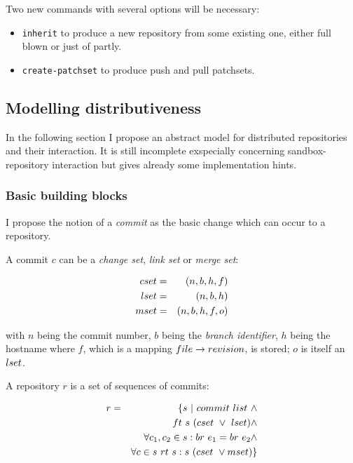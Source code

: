 \documentclass[fleqn, german, 10pt, a4paper]{article}
\begin{document}
Two new commands with several options will be necessary:
\begin{itemize}
\item \texttt{inherit} to produce a new repository from some existing one,
either full blown or just of partly.
\item \texttt{create-patchset} to produce push and pull patchsets.
\end{itemize}

\subsection{Modelling distributiveness}

In the following section I propose an abstract model for distributed
repositories and their interaction. It is still incomplete
exspecially concerning sandbox-repository interaction but gives already
some implementation hints.

\subsubsection{Basic building blocks}

I propose the notion of a \emph{commit} as the basic change which can
occur to a repository.

A commit $c$ can be a \emph{change set}, \emph{link set} or
\emph{merge set}:

\begin{eqnarray*}
\mathnormal{cset} &=& (n, b, h, f) \\
\mathnormal{lset} &=& (n, b, h) \\
\mathnormal{mset} &=& (n, b, h, f, o)
\end{eqnarray*}

with $n$ being the commit number, $b$ being the \emph{branch identifier},
$h$ being the hostname where $f$, which is a mapping
$\mathnormal{file} \rightarrow \mathnormal{revision}$, is stored; $o$
is itself an $\mathnormal{lset}$.

A repository $r$ is a set of sequences of commits:

\begin{eqnarray*}
r &=& \{s\ |\ \mathnormal{commit}\ \mathnormal{list} \ \wedge \\
&&    \mathnormal{ft}\ s\ (\mathnormal{cset} \ \vee \ \mathnormal{lset}) \wedge \\
&&    \forall c_1, c_2 \in s: \mathnormal{br}\ e_1 = \mathnormal{br}\ e_2 \wedge \\
&&    \forall c \in s \ \mathnormal{rt}\ s : s\ (\mathnormal{cset} \ \vee
      \mathnormal{mset})\}
\end{eqnarray*}
\end{document}
